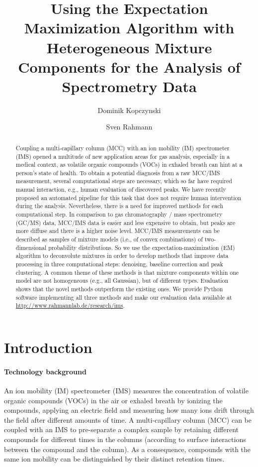 \documentclass{article}
\title{Using the Expectation Maximization Algorithm with Heterogeneous Mixture Components for the Analysis of Spectrometry Data}
\author[1]{Dominik Kopczynski}
\author[2]{Sven Rahmann}
\affil[1]{Collaborative Research Center SFB~876, TU~Dortmund, Germany}
\affil[2]{Genome Informatics, Institute of Human Genetics, Faculty of Medicine, University of Duisburg-Essen, and University Hospital Essen, Germany}
\begin{document}
\maketitle
\begin{abstract}
Coupling a multi-capillary column (MCC) with an ion mobility (IM) spectrometer (IMS) opened a multitude of new application areas for gas analysis, especially in a medical context, as volatile organic compounds (VOCs) in exhaled breath can hint at a person's state of health.
To obtain a potential diagnosis from a raw MCC/IMS measurement, several computational steps are necessary, which so far have required manual interaction, e.g., human evaluation of discovered peaks.
We have recently proposed an automated pipeline for this task that does not require human intervention during the analysis.
Nevertheless, there is a need for improved methods for each computational step.
In comparison to gas chromatography / mass spectrometry (GC/MS) data, MCC/IMS data is easier and less expensive to obtain, but peaks are more diffuse and there is a higher noise level.
MCC/IMS measurements can be described as samples of mixture models (i.e., of convex combinations) of two-dimensional probability distributions.
So we use the expectation-maximization (EM) algorithm to deconvolute mixtures in order to develop methods that improve data processing in three computational steps: denoising, baseline correction and peak clustering.
A common theme of these methods is that mixture components within one model are not homogeneous (e.g., all Gaussian), but of different types.
Evaluation shows that the novel methods outperform the existing ones.
We provide Python software implementing all three methods and make our evaluation data available at \url{http://www.rahmannlab.de/research/ims}.
\end{abstract}








\section{Introduction}
\label{sec:intro}

\paragraph*{Technology background}
An ion mobility (IM) spectrometer (IMS) measures the concentration of volatile organic compounds (VOCs) in the air or exhaled breath by ionizing the compounds, applying an electric field and measuring how many ions drift through the field after different amounts of time.
A multi-capillary column (MCC) can be coupled with an IMS to pre-separate a complex sample by retaining different compounds for different times in the columns (according to surface interactions between the compound and the column).
As a consequence, compounds with the same ion mobility can be distinguished by their distinct retention times.
\end{document}
